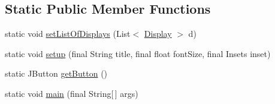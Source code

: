 \subsection*{Static Public Member Functions}
\begin{DoxyCompactItemize}
\item 
static void \hyperlink{classgov_1_1fnal_1_1ppd_1_1ZZattic_1_1IdentifyAll_a6d7b2f33f2aa136b59a347d6571aab5b}{set\-List\-Of\-Displays} (List$<$ \hyperlink{interfacegov_1_1fnal_1_1ppd_1_1dd_1_1signage_1_1Display}{Display} $>$ d)
\item 
static void \hyperlink{classgov_1_1fnal_1_1ppd_1_1ZZattic_1_1IdentifyAll_a7ed8528dfcc7fde5c6b744a5fd68d6a8}{setup} (final String title, final float font\-Size, final Insets inset)
\item 
static J\-Button \hyperlink{classgov_1_1fnal_1_1ppd_1_1ZZattic_1_1IdentifyAll_aeae2a458075736509e702ee208ae5092}{get\-Button} ()
\item 
static void \hyperlink{classgov_1_1fnal_1_1ppd_1_1ZZattic_1_1IdentifyAll_a3cfdf38b80637265de10f48b4e4097b1}{main} (final String\mbox{[}$\,$\mbox{]} args)
\end{DoxyCompactItemize}


